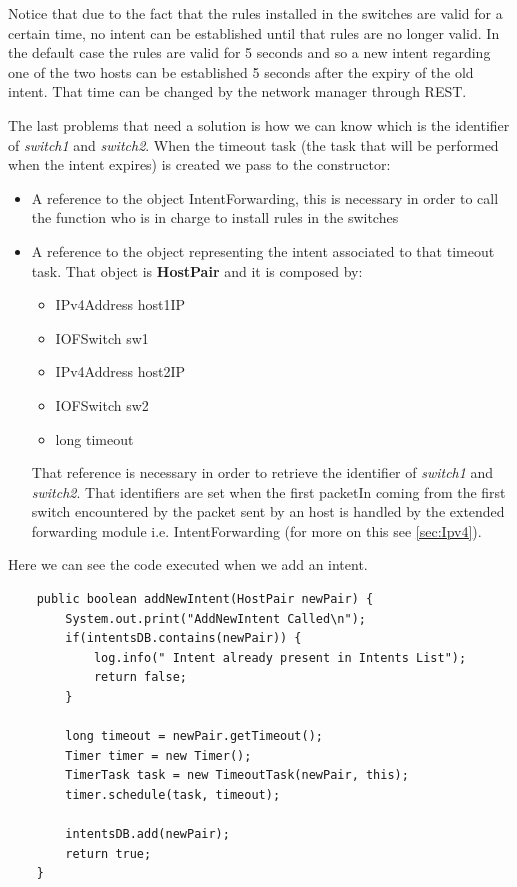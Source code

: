 \documentclass[a4paper]{report}
\begin{document}
	 \noindent Notice that due to the fact that the rules installed in the switches are valid for a certain time, no intent can be established until that rules are no longer valid. In the default case the rules are valid for 5 seconds and so a new intent regarding one of the two hosts can be established 5 seconds after the expiry of the old intent. That time can be changed by the network manager through REST.
	 
	 \noindent The last problems that need a solution is how we can know which is the identifier of \textit{switch1} and \textit{switch2}. When the timeout task (the task that will be performed when the intent expires) is created we pass to the constructor:
	 \begin{itemize}
	 	\item A reference to the object IntentForwarding, this is necessary in order to call the function who is in charge to install rules in the switches
	 	\item A reference to the object representing the intent associated to that timeout task. That object is \textbf{HostPair} and it is composed by:
	 	\begin{itemize}
	 		\item IPv4Address host1IP
	 		\item IOFSwitch sw1
	 		\item IPv4Address host2IP
	 		\item IOFSwitch sw2
	 		\item long timeout
	 	\end{itemize}
 		\noindent That reference is necessary in order to retrieve the identifier of \textit{switch1} and \textit{switch2}. That identifiers are set when the first packetIn coming from the first switch encountered by the packet sent by an host is handled by the extended forwarding module i.e. IntentForwarding (for more on this see \ref{sec:Ipv4}).
	 \end{itemize}
 	\noindent Here we can see the code executed when we add an intent.
 	
 	\begin{lstlisting}
 	public boolean addNewIntent(HostPair newPair) {
 		System.out.print("AddNewIntent Called\n");
 		if(intentsDB.contains(newPair)) {
 			log.info(" Intent already present in Intents List");
 			return false;
 		}
 			
 		long timeout = newPair.getTimeout();
 		Timer timer = new Timer();
 		TimerTask task = new TimeoutTask(newPair, this);
 		timer.schedule(task, timeout);
 			
 		intentsDB.add(newPair);
 		return true;
 	}
 	\end{lstlisting}
	
\end{document}
